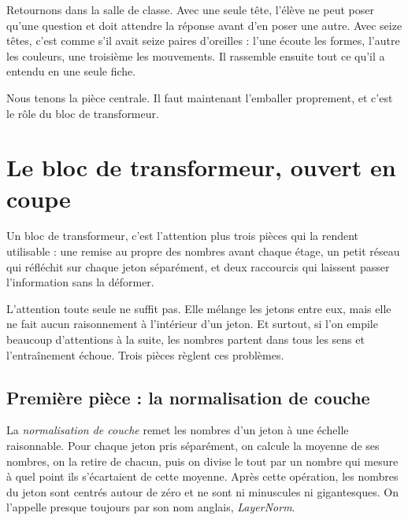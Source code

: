 \begin{intuition}
Retournons dans la salle de classe. Avec une seule tête, l'élève ne peut
poser qu'une question et doit attendre la réponse avant d'en poser une
autre. Avec seize têtes, c'est comme s'il avait seize paires d'oreilles :
l'une écoute les formes, l'autre les couleurs, une troisième les
mouvements. Il rassemble ensuite tout ce qu'il a entendu en une seule fiche.
\end{intuition}

Nous tenons la pièce centrale. Il faut maintenant l'emballer proprement, et
c'est le rôle du bloc de transformeur.

\section{Le bloc de transformeur, ouvert en coupe}

\begin{enclair}
Un bloc de transformeur, c'est l'attention plus trois pièces qui la rendent
utilisable : une remise au propre des nombres avant chaque étage, un petit
réseau qui réfléchit sur chaque jeton séparément, et deux raccourcis qui
laissent passer l'information sans la déformer.
\end{enclair}

L'attention toute seule ne suffit pas. Elle mélange les jetons entre eux,
mais elle ne fait aucun raisonnement à l'intérieur d'un jeton. Et surtout,
si l'on empile beaucoup d'attentions à la suite, les nombres partent dans
tous les sens et l'entraînement échoue. Trois pièces règlent ces problèmes.

\subsection*{Première pièce : la normalisation de couche}

\begin{definition}
La \emph{normalisation de couche} remet les nombres d'un jeton à une échelle
raisonnable. Pour chaque jeton pris séparément, on calcule la moyenne de ses
nombres, on la retire de chacun, puis on divise le tout par un nombre qui
mesure à quel point ils s'écartaient de cette moyenne. Après cette
opération, les nombres du jeton sont centrés autour de zéro et ne sont ni
minuscules ni gigantesques. On l'appelle presque toujours par son nom
anglais, \emph{LayerNorm}.
\end{definition}

